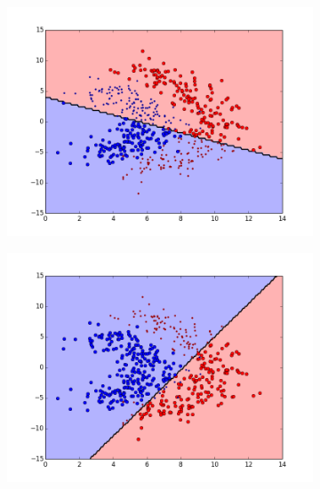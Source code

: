 \begin{figure}[t!]
\medskip
\begin{subfigure}{0.48\textwidth}
\includegraphics[width=\linewidth]{figs/Lithuanian/44All-Classifiers}
\caption{} \label{fig:Lithuanian_all_single_c}
\end{subfigure}\hspace*{\fill}
\begin{subfigure}{0.48\textwidth}
\includegraphics[width=\linewidth]{figs/Lithuanian/65All-Classifiers}
\caption{} \label{fig:Lithuanian_all_single_d}
\end{subfigure}


\end{figure}
